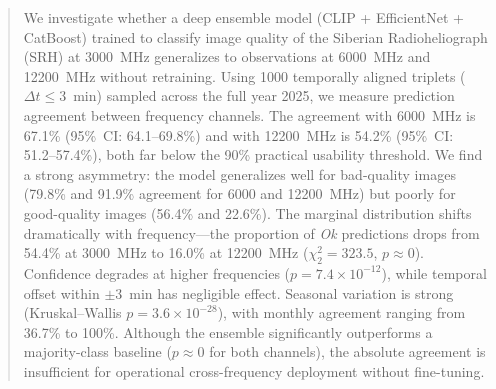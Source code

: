\documentclass{article}
\theoremstyle{plain}
\theoremstyle{definition}
\begin{document}

\printAffiliationsAndNotice{}

\begin{abstract}
We investigate whether a deep ensemble model (CLIP + EfficientNet + CatBoost)
trained to classify image quality of the Siberian Radioheliograph (SRH) at
3000~MHz generalizes to observations at 6000~MHz and 12200~MHz without
retraining.  Using 1000 temporally aligned triplets ($\Delta t \leq 3$~min)
sampled across the full year 2025, we measure prediction agreement between
frequency channels.  The agreement with 6000~MHz is 67.1\% (95\%~CI:
64.1--69.8\%) and with 12200~MHz is 54.2\% (95\%~CI: 51.2--57.4\%),
both far below the 90\% practical usability threshold.  We find a strong
asymmetry: the model generalizes well for bad-quality images (79.8\% and
91.9\% agreement for 6000 and 12200~MHz) but poorly for good-quality images
(56.4\% and 22.6\%).  The marginal distribution shifts dramatically with
frequency---the proportion of \emph{Ok} predictions drops from 54.4\% at
3000~MHz to 16.0\% at 12200~MHz ($\chi^2_{2} = 323.5$, $p \approx 0$).
Confidence degrades at higher frequencies ($p = 7.4\times10^{-12}$),
while temporal offset within $\pm3$~min has negligible effect.  Seasonal
variation is strong (Kruskal--Wallis $p = 3.6\times10^{-28}$), with
monthly agreement ranging from 36.7\% to 100\%.  Although the ensemble
significantly outperforms a majority-class baseline ($p \approx 0$ for
both channels), the absolute agreement is insufficient for operational
cross-frequency deployment without fine-tuning.
\end{abstract}
\end{document}
